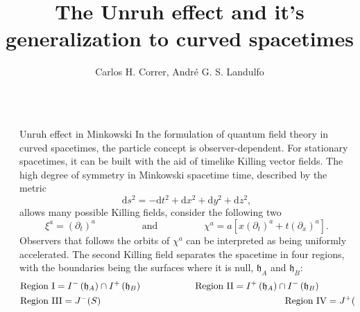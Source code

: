 \documentclass[final, border=3pt]{beamer}
\title{The Unruh effect and it's generalization to curved spacetimes} %
\author{Carlos H. Correr, André G. S. Landulfo} %
\institute{Institute of Physics, University of São Paulo} %
\newlength{\sepmargin}
\newlength{\onecolwid}
\begin{document}
  \setlength{\belowcaptionskip}{2ex} %
  \setlength\belowdisplayshortskip{1ex} %
  
  
    \begin{frame}[t] %

        \begin{columns}[t] %
	  
            \begin{column}{\sepmargin}\end{column}
      
	        \begin{column}{\onecolwid} %
          
                \begin{block}{Unruh effect in Minkowski}
                    In the formulation of quantum field theory in curved spacetimes, the particle concept is observer-dependent. For stationary spacetimes, it can be built with the aid of timelike Killing vector fields. The high degree of symmetry in Minkowski spacetime time, described by the metric
                    \begin{equation}
                        \mathrm{d}s^2=-\mathrm{d}t^2+\mathrm{d}x^2+\mathrm{d}y^2+\mathrm{d}z^2,
                    \end{equation}
                    allows many possible Killing fields, consider the following two
                    \begin{equation}
                        \xi^a=\left(\partial_t\right)^a\hspace{2cm}\text{and}\hspace{2cm}\chi^a=a\left[x\left(\partial_t\right)^a+t\left(\partial_x\right)^a\right].
                    \end{equation}
                    Observers that follows the orbits of \(\chi^a\) can be interpreted as being uniformly accelerated. The second Killing field separates the spacetime in four regions, with the boundaries being the surfaces where it is null, \(\mathfrak{h}_A\) and \(\mathfrak{h}_B\):
                    \begin{equation}
                        \begin{aligned}
                            &\text{Region I}=I^-\left(\mathfrak{h}_A\right)\cap I^+\left(\mathfrak{h}_B\right)\hspace{2cm}\text{Region II}=I^+\left(\mathfrak{h}_A\right)\cap I^-\left(\mathfrak{h}_B\right)\\
                            &\text{Region III}=J^-(S)\hspace{6.9cm}\text{Region IV}=J^+(S)
                        \end{aligned}.
                    \end{equation}


\end{block}
\end{column}
\end{columns}
\end{frame}
\end{document}
